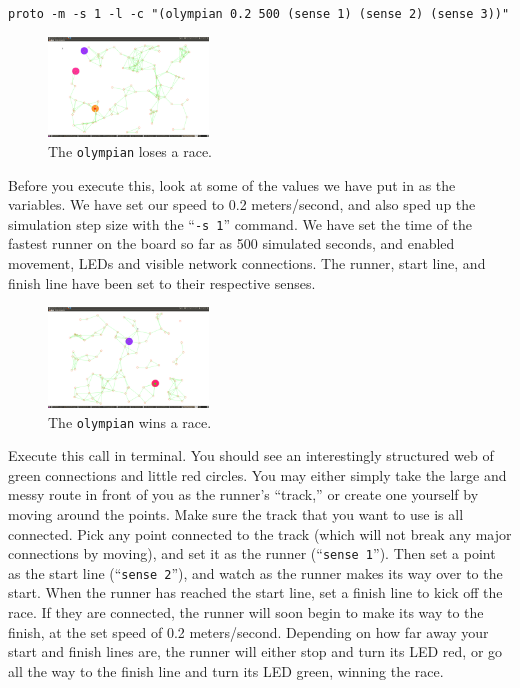 \documentclass{article}
\newcommand\code[1]{\begin{center}\var{#1}\end{center}}
\newcommand\var[1]{{\tt #1}}
\newcommand\qvar[1]{``{\tt #1}''}
\begin{document}
\code{proto -m -s 1 -l -c "(olympian 0.2 500 (sense 1) (sense 2) (sense 3))"}

\begin{figure}
  \includegraphics[width=0.38\textwidth]{figures/olympian-lose.png}
  \caption{The \var{olympian} loses a race.}
  \label{f:olympianloes}
\end{figure}

Before you execute this, look at some of the values we have put in as
the variables. We have set our speed to 0.2 meters/second, and also
sped up the simulation step size with the \qvar{-s 1} command.  We
have set the time of the fastest runner on the board so far as 500
simulated seconds, and enabled movement, LEDs and visible network
connections.  The runner, start line, and finish line have been set to
their respective senses.

\begin{figure}
  \includegraphics[width=0.38\textwidth]{figures/olympian-win.png}
  \caption{The \var{olympian} wins a race.}
  \label{f:olympianwin}
\end{figure}

Execute this call in terminal. You should see an interestingly
structured web of green connections and little red circles.  You may
either simply take the large and messy route in front of you as the
runner's ``track,'' or create one yourself by moving around the
points.  Make sure the track that you want to use is all connected.
Pick any point connected to the track (which will not break any major
connections by moving), and set it as the runner (\qvar{sense 1}).
Then set a point as the start line (\qvar{sense 2}), and watch as the
runner makes its way over to the start.  When the runner has reached
the start line, set a finish line to kick off the race.  If they are
connected, the runner will soon begin to make its way to the finish,
at the set speed of 0.2 meters/second.  Depending on how far away your
start and finish lines are, the runner will either stop and turn its
LED red, or go all the way to the finish line and turn its LED green,
winning the race.
\end{document}
